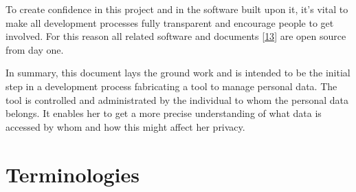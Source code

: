 \documentclass[12pt,english,a4paper,titlepage,cleardoublepage=empty,dottedtoc]{report}
\begin{document}
To create confidence in this project and in the software built upon it,
it's vital to make all development processes fully transparent and
encourage people to get involved. For this reason all related software
and documents {[}\protect\hyperlink{ref-repo_2016_pdaas-spec}{13}{]} are
open source from day one.

In summary, this document lays the ground work and is intended to be the
initial step in a development process fabricating a tool to manage
personal data. The tool is controlled and administrated by the
individual to whom the personal data belongs. It enables her to get a
more precise understanding of what data is accessed by whom and how this
might affect her privacy.

\hypertarget{terminologies}{\section{Terminologies}\label{terminologies}}
\end{document}
